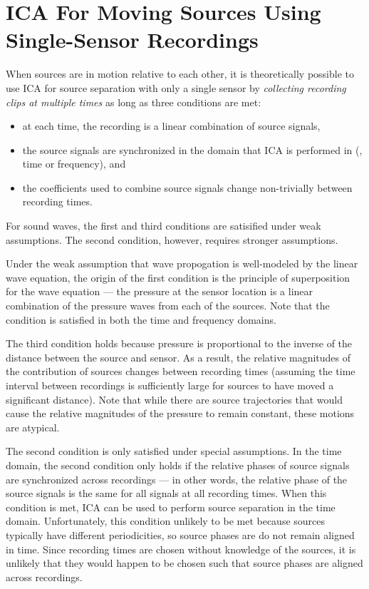\documentclass[10pt]{article}
\begin{document}
\section{ICA For Moving Sources Using Single-Sensor Recordings}
When sources are in motion relative to each other, it is theoretically possible to use ICA
for source separation with only a single sensor by \emph{collecting recording clips at
multiple times} as long as three conditions are met:
\begin{itemize}
    \item at each time, the recording is a linear combination of source signals,

    \item the source signals are synchronized in the domain that ICA is performed in
        (\ie, time or frequency), and

    \item the coefficients used to combine source signals change non-trivially between
        recording times.
\end{itemize}
For sound waves, the first and third conditions are satisified under weak assumptions.
The second condition, however, requires stronger assumptions.

Under the weak assumption that wave propogation is well-modeled by the linear wave equation,
the origin of the first condition is the principle of superposition for the wave equation
--- the pressure at the sensor location is a linear combination of the pressure waves from
each of the sources. Note that the condition is satisfied in both the time and frequency
domains.

The third condition holds because pressure is proportional to the inverse of the distance
between the source and sensor. As a result, the relative magnitudes of the contribution of
sources changes between recording times (assuming the time interval between recordings is
sufficiently large for sources to have moved a significant distance). Note that while there
are source trajectories that would cause the relative magnitudes of the pressure to remain
constant, these motions are atypical.

The second condition is only satisfied under special assumptions. In the time domain, the
second condition only holds if the relative phases of source signals are synchronized
across recordings --- in other words, the relative phase of the source signals is the same
for all signals at all recording times. When this condition is met, ICA can be used to
perform source separation in the time domain. Unfortunately, this condition unlikely to be
met because sources typically have different periodicities, so source phases are do not
remain aligned in time. Since recording times are chosen without knowledge of the sources,
it is unlikely that they would happen to be chosen such that source phases are aligned
across recordings.
\end{document}
